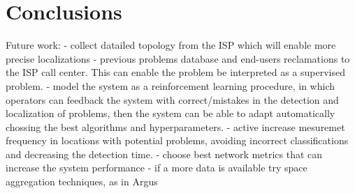 \chapter{Conclusions}


Future work:
- collect datailed topology from the ISP which will enable more precise
localizations
- previous problems database and end-users reclamations to the ISP call center.
This can enable the problem be interpreted as a supervised problem.
- model the system as a reinforcement learning procedure, in which operators
can feedback the system with correct/mistakes in the detection and localization
of problems, then the system can be able to adapt automatically chossing the
best algorithms and hyperparameters.
- active increase mesuremet frequency in locations with potential problems,
avoiding incorrect classifications and decreasing the detection time.
- choose best network metrics that can increase the system performance
- if a more data is available try space aggregation techniques, as in Argus
